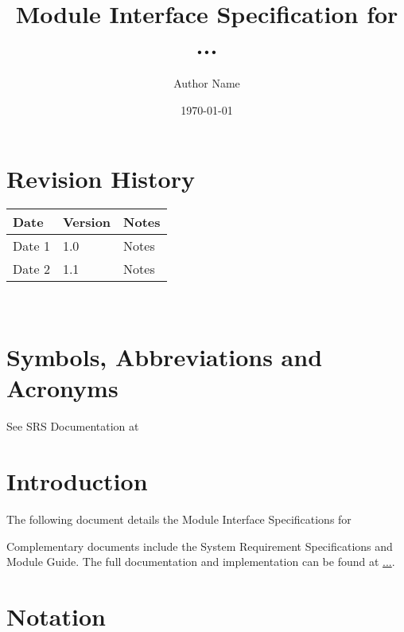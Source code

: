\documentclass[12pt, titlepage]{article}
\begin{document}
\title{Module Interface Specification for ...}

\author{Author Name}

\date{\today}

\maketitle


\section{Revision History}

\begin{tabularx}{\textwidth}{p{3cm}p{2cm}X}
\toprule {\bf Date} & {\bf Version} & {\bf Notes}\\
\midrule
Date 1 & 1.0 & Notes\\
Date 2 & 1.1 & Notes\\
\bottomrule
\end{tabularx}

~\newpage

\section{Symbols, Abbreviations and Acronyms}

See SRS Documentation at 


\newpage

\tableofcontents

\newpage


\section{Introduction}

The following document details the Module Interface Specifications for

Complementary documents include the System Requirement Specifications
and Module Guide.  The full documentation and implementation can be
found at \url{...}.  

\section{Notation}
\end{document}
